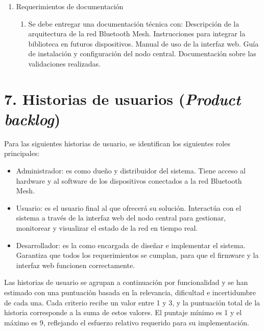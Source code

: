 \documentclass[
11pt, %
]{charter}
\begin{document}
\begin{enumerate}
\item Requerimientos de documentación
	\begin{enumerate}
		\item Se debe entregar una documentación técnica con:
			\subitem Descripción de la arquitectura de la red Bluetooth Mesh.
			\subitem Instrucciones para integrar la biblioteca en futuros dispositivos.
			\subitem Manual de uso de la interfaz web.
			\subitem Guía de instalación y configuración del nodo central.
			\subitem Documentación sobre las validaciones realizadas.
	\end{enumerate}

\end{enumerate}


\section{7. Historias de usuarios (\textit{Product backlog})}
\label{sec:backlog}

Para las siguientes historias de usuario, se identifican los siguientes roles principales:

\begin{itemize}
	\item Administrador: es {\empclientename} como dueño y distribuidor del sistema. Tiene acceso al hardware y al software de los dispositivos conectados a la red Bluetooth Mesh.
	\item Usuario: es el usuario final al que {\empclientename} ofrecerá su solución. Interactúa con el sistema a través de la interfaz web del nodo central para gestionar, monitorear y visualizar el estado de la red en tiempo real.
	\item Desarrollador: es la {\authorname} como encargada de diseñar e implementar el sistema. Garantiza que todos los requerimientos se cumplan, para que el firmware y la interfaz web funcionen correctamente.
\end{itemize}

Las historias de usuario se agrupan a continuación por funcionalidad y se han estimado con una puntuación basada en la relevancia, dificultad e incertidumbre de cada una. Cada criterio recibe un valor entre 1 y 3, y la puntuación total de la historia corresponde a la suma de estos valores. El puntaje mínimo es 1 y el máximo es 9, reflejando el esfuerzo relativo requerido para su implementación.
\end{document}
